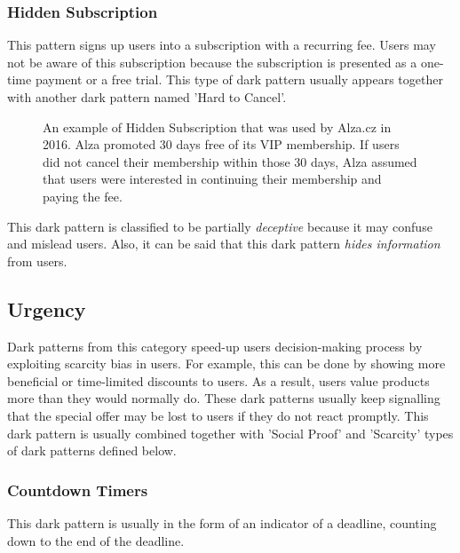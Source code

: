         \subsubsection{Hidden Subscription}
        This pattern signs up users into a subscription with a recurring fee. Users may not be aware of this subscription because the subscription is presented as a one-time payment or a free trial. This type of dark pattern usually appears together with another dark pattern named 'Hard to Cancel'. 
        
        \begin{figure}[ht]
            \centering
            \caption{An example of Hidden Subscription that was used by Alza.cz in 2016\cite{hidden-subscription-alza-2016}. Alza promoted 30 days free of its VIP membership. If users did not cancel their membership within those 30 days, Alza assumed that users were interested in continuing their membership and paying the fee.}
            \label{fig:hidden-subscription-alza}
        \end{figure}

        This dark pattern is classified to be partially \emph{deceptive} because it may confuse and mislead users. Also, it can be said that this dark pattern \emph{hides information} from users.
    \subsection{Urgency}
    Dark patterns from this category speed-up users decision-making process by exploiting scarcity bias in users. For example, this can be done by showing more beneficial or time-limited discounts to users. As a result, users value products more than they would normally do. These dark patterns usually keep signalling that the special offer may be lost to users if they do not react promptly. This dark pattern is usually combined together with 'Social Proof' and 'Scarcity' types of dark patterns defined below.
        \subsubsection{Countdown Timers}
        This dark pattern is usually in the form of an indicator of a deadline, counting down to the end of the deadline. 
        
